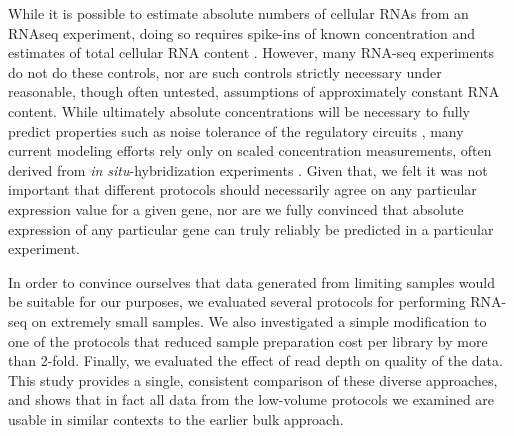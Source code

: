 While it is possible to estimate absolute numbers of cellular RNAs from an RNAseq experiment, doing so requires spike-ins of known concentration and estimates of total cellular RNA content \cite{Mortazavi:2008jj}. However, many RNA-seq experiments do not do these controls, nor are such controls strictly necessary under reasonable, though often untested, assumptions of approximately constant RNA content. While ultimately absolute concentrations will be necessary to fully predict properties such as noise tolerance of the regulatory circuits \cite{Gregor:2007du,Gregor:2005jn}, many current modeling efforts rely only on scaled concentration measurements, often derived from {\em in situ}-hybridization experiments \cite{Garcia:2013fs,Ilsley:2013fk,He:2010ix}.  Given that, we felt it was not important that different protocols should necessarily agree on any particular expression value for a given gene, nor are we fully convinced that absolute expression of any particular gene can truly reliably be predicted in a particular experiment.

In order to convince ourselves that data generated from limiting samples would be suitable for our purposes, we evaluated several protocols for performing RNA-seq on extremely small samples.  We also investigated a simple modification to one of the protocols that reduced sample preparation cost per library by more than 2-fold.  Finally, we evaluated the effect of read depth on quality of the data.  This study provides a single, consistent comparison of these diverse approaches, and shows that in fact all data from the low-volume protocols we examined are usable in similar contexts to the earlier bulk approach.
